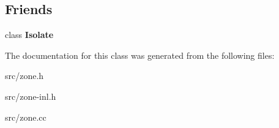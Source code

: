 \subsection*{Friends}
\begin{DoxyCompactItemize}
\item 
\hypertarget{classv8_1_1internal_1_1_zone_aba4f0964bdacf2bbf62cf876e5d28d0a}{}class {\bfseries Isolate}\label{classv8_1_1internal_1_1_zone_aba4f0964bdacf2bbf62cf876e5d28d0a}

\end{DoxyCompactItemize}


The documentation for this class was generated from the following files\+:\begin{DoxyCompactItemize}
\item 
src/zone.\+h\item 
src/zone-\/inl.\+h\item 
src/zone.\+cc\end{DoxyCompactItemize}
